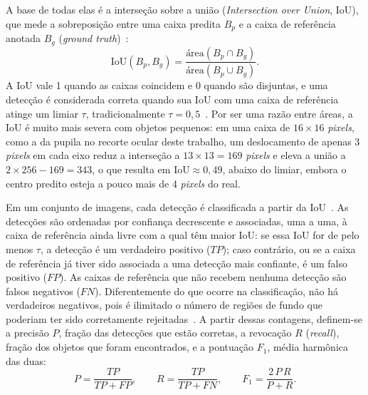 A base de todas elas é a interseção sobre a união (\textit{Intersection over Union}, IoU), que mede a sobreposição entre uma caixa predita $B_p$ e a caixa de referência anotada $B_g$ (\textit{ground truth})~\cite{everingham2010pascal}:
\begin{equation}
    \mathrm{IoU}(B_p, B_g) = \frac{\text{área}(B_p \cap B_g)}{\text{área}(B_p \cup B_g)}.
    \label{eq:iou}
\end{equation}
A IoU vale 1 quando as caixas coincidem e 0 quando são disjuntas, e uma detecção é considerada correta quando sua IoU com uma caixa de referência atinge um limiar $\tau$, tradicionalmente $\tau = 0{,}5$~\cite{everingham2010pascal}. Por ser uma razão entre áreas, a IoU é muito mais severa com objetos pequenos: em uma caixa de $16 \times 16$ \textit{pixels}, como a da pupila no recorte ocular deste trabalho, um deslocamento de apenas 3 \textit{pixels} em cada eixo reduz a interseção a $13 \times 13 = 169$ \textit{pixels} e eleva a união a $2 \times 256 - 169 = 343$, o que resulta em $\mathrm{IoU} \approx 0{,}49$, abaixo do limiar, embora o centro predito esteja a pouco mais de 4 \textit{pixels} do real.

Em um conjunto de imagens, cada detecção é classificada a partir da IoU~\cite{everingham2010pascal,padilla2020survey}. As detecções são ordenadas por confiança decrescente e associadas, uma a uma, à caixa de referência ainda livre com a qual têm maior IoU: se essa IoU for de pelo menos $\tau$, a detecção é um verdadeiro positivo ($TP$); caso contrário, ou se a caixa de referência já tiver sido associada a uma detecção mais confiante, é um falso positivo ($FP$). As caixas de referência que não recebem nenhuma detecção são falsos negativos ($FN$). Diferentemente do que ocorre na classificação, não há verdadeiros negativos, pois é ilimitado o número de regiões de fundo que poderiam ter sido corretamente rejeitadas~\cite{padilla2020survey}. A partir dessas contagens, definem-se a precisão $P$, fração das detecções que estão corretas, a revocação $R$ (\textit{recall}), fração dos objetos que foram encontrados, e a pontuação $F_1$, média harmônica das duas:
\begin{equation}
    P = \frac{TP}{TP + FP}, \qquad R = \frac{TP}{TP + FN}, \qquad F_1 = \frac{2\,P\,R}{P + R}.
    \label{eq:precisao_revocacao}
\end{equation}

